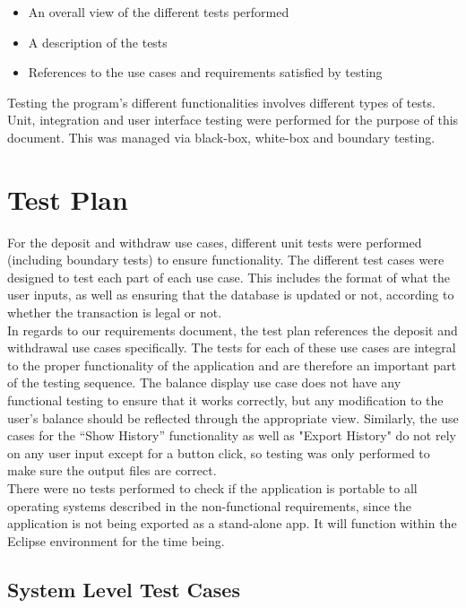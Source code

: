 \documentclass[12pt]{article}
\begin{document}
\begin{itemize}
  \item An overall view of the different tests performed
  \item A description of the tests
  \item References to the use cases and requirements satisfied by testing
\end{itemize}

Testing the program's different functionalities involves different types of tests. Unit, integration and user interface testing were performed for the purpose of this document. This was managed via black-box, white-box and boundary testing.

\section{Test Plan}

For the deposit and withdraw use cases, different unit tests were performed (including boundary tests) to ensure functionality. The different test cases were designed to test each part of each use case. This includes the format of what the user inputs, as well as ensuring that the database is updated or not, according to whether the transaction is legal or not.\\

In regards to our requirements document, the test plan references the deposit and withdrawal use cases specifically. The tests for each of these use cases are integral to the proper functionality of the application and are therefore an important part of the testing sequence. The balance display use case does not have any functional testing to ensure that it works correctly, but any modification to the user's balance should be reflected through the appropriate view. Similarly, the use cases for the ``Show History'' functionality as well as "Export History" do not rely on any user input except for a button click, so testing was only performed to make sure the output files are correct.\\

There were no tests performed to check if the application is portable to all operating systems described in the non-functional requirements, since the application is not being exported as a stand-alone app. It will function within the Eclipse environment for the time being.

\subsection{System Level Test Cases}
\end{document}
